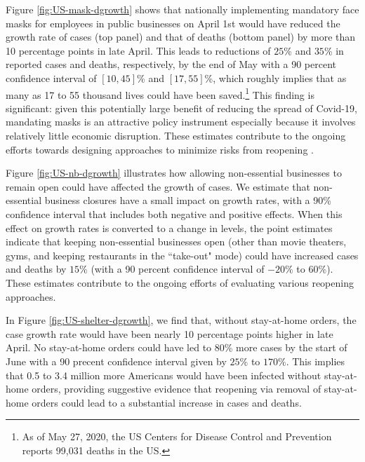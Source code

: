 \documentclass[11pt,reqno,letter]{amsart}
\theoremstyle{definition}
\begin{document}
Figure \ref{fig:US-mask-dgrowth} shows that nationally  implementing mandatory
face masks  for employees in public businesses on April 1st would have reduced the growth rate of cases (top panel)
and that of deaths (bottom panel) by more than 10 percentage points in late April. This leads to reductions of $25$\% and $35$\% in reported cases and deaths, respectively,  by the end of May with a 90 percent confidence interval of $[10,45]$\% and $[17,55]$\%, which  roughly implies that as many as 17 to 55
  thousand lives could have been saved.\footnote{As of May 27, 2020,
   the US Centers for Disease Control and Prevention  reports 99,031
   deaths in the US.}
This finding is significant: given this potentially large  benefit of reducing the spread of Covid-19, mandating masks is an attractive policy instrument especially because it involves relatively little economic disruption. These estimates contribute to the ongoing efforts towards designing approaches to minimize risks from reopening \citep{stock2020b}.


Figure \ref{fig:US-nb-dgrowth} illustrates how allowing non-essential businesses to remain open could
have affected the growth of cases.  We estimate that
non-essential business closures have a small impact on growth rates,
with a 90\% confidence interval that includes both negative and
positive effects. When this effect on growth rates is converted to a
change in levels, the point estimates indicate that keeping
non-essential businesses open (other than movie theaters, gyms, and
keeping restaurants in the ``take-out" mode) could have increased
cases and  deaths by  $15\%$ (with a 90 percent confidence interval of
$-20\%$ to $60\%$).  These estimates contribute to the ongoing efforts of evaluating various reopening approaches.


In Figure \ref{fig:US-shelter-dgrowth}, we find that, without stay-at-home orders, the case
growth rate would have been nearly 10 percentage points higher in late April. No stay-at-home orders could have led to 80\% more cases by the start of June with a 90 precent confidence interval given by  $25\%$ to $170\%$. This implies that 0.5 to 3.4 million more Americans would have been infected without stay-at-home orders, providing suggestive evidence that reopening via removal of stay-at-home orders could lead to a substantial increase in cases and deaths.
\end{document}
